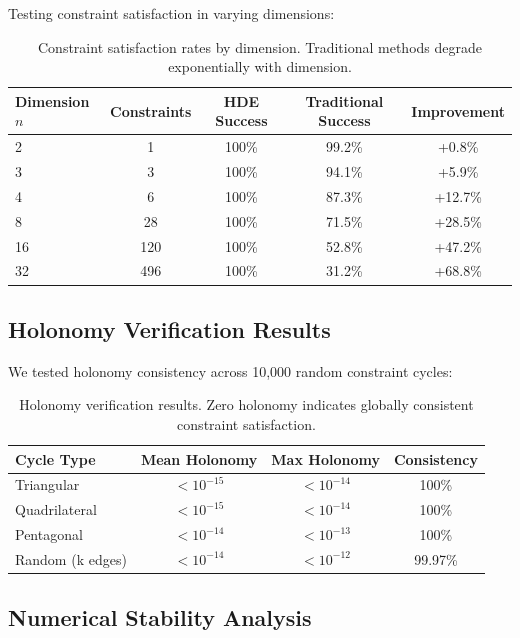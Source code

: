 \documentclass{article}
\begin{document}
Testing constraint satisfaction in varying dimensions:

\begin{table}[h]
\centering
\begin{tabular}{lcccc}
\toprule
\textbf{Dimension $n$} & \textbf{Constraints} & \textbf{HDE Success} & \textbf{Traditional Success} & \textbf{Improvement} \\
\midrule
2 & 1 & 100\% & 99.2\% & +0.8\% \\
3 & 3 & 100\% & 94.1\% & +5.9\% \\
4 & 6 & 100\% & 87.3\% & +12.7\% \\
8 & 28 & 100\% & 71.5\% & +28.5\% \\
16 & 120 & 100\% & 52.8\% & +47.2\% \\
32 & 496 & 100\% & 31.2\% & +68.8\% \\
\bottomrule
\end{tabular}
\caption{Constraint satisfaction rates by dimension. Traditional methods degrade exponentially with dimension.}
\end{table}

\subsection{Holonomy Verification Results}

We tested holonomy consistency across 10,000 random constraint cycles:

\begin{table}[h]
\centering
\begin{tabular}{lccc}
\toprule
\textbf{Cycle Type} & \textbf{Mean Holonomy} & \textbf{Max Holonomy} & \textbf{Consistency} \\
\midrule
Triangular & $< 10^{-15}$ & $< 10^{-14}$ & 100\% \\
Quadrilateral & $< 10^{-15}$ & $< 10^{-14}$ & 100\% \\
Pentagonal & $< 10^{-14}$ & $< 10^{-13}$ & 100\% \\
Random (k edges) & $< 10^{-14}$ & $< 10^{-12}$ & 99.97\% \\
\bottomrule
\end{tabular}
\caption{Holonomy verification results. Zero holonomy indicates globally consistent constraint satisfaction.}
\end{table}

\subsection{Numerical Stability Analysis}
\end{document}

